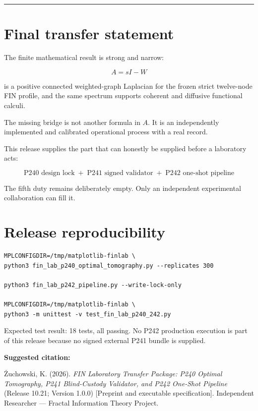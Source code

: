 \documentclass[11pt,a4paper,openany]{report}
\begin{document}
\par\medskip\hrule\medskip

\chapter{Final transfer statement}

The finite mathematical result is strong and narrow:

\[
A=sI-W
\]

is a positive connected weighted-graph Laplacian for the frozen strict twelve-node FIN profile, and the same spectrum supports coherent and diffusive functional calculi.

The missing bridge is not another formula in \(A\). It is an independently implemented and calibrated operational process with a real record.

This release supplies the part that can honestly be supplied before a laboratory acts:

\[
\boxed{
\text{P240 design lock}
\;+\;
\text{P241 signed validator}
\;+\;
\text{P242 one-shot pipeline}
}
\]

The fifth duty remains deliberately empty. Only an independent experimental collaboration can fill it.


\clearpage
\chapter*{Release reproducibility}
\begin{Verbatim}[fontsize=\small]
MPLCONFIGDIR=/tmp/matplotlib-finlab \
python3 fin_lab_p240_optimal_tomography.py --replicates 300

python3 fin_lab_p242_pipeline.py --write-lock-only

MPLCONFIGDIR=/tmp/matplotlib-finlab \
python3 -m unittest -v test_fin_lab_p240_242.py
\end{Verbatim}

Expected test result: 18 tests, all passing.  No P242 production execution is
part of this release because no signed external P241 bundle is supplied.

\medskip
\noindent\textbf{Suggested citation:}

\.Zuchowski, K. (2026). \emph{FIN Laboratory Transfer Package: P240 Optimal
Tomography, P241 Blind-Custody Validator, and P242 One-Shot Pipeline}
(Release 10.21; Version 1.0.0) [Preprint and executable specification].
Independent Researcher --- Fractal Information Theory Project.
\end{document}
